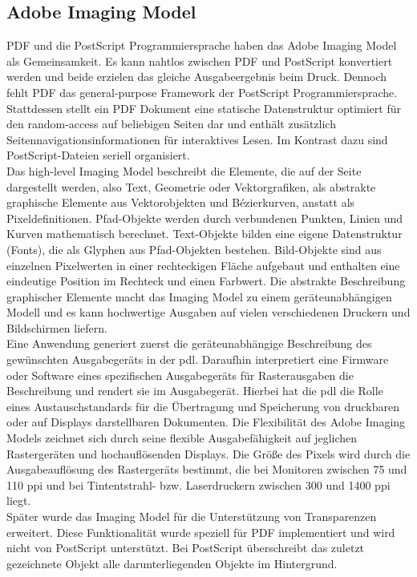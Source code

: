 \subsection{Adobe Imaging Model}
PDF und die PostScript Programmiersprache haben das Adobe Imaging Model als Gemeinsamkeit. Es kann nahtlos zwischen PDF und PostScript konvertiert werden und beide erzielen das gleiche Ausgabeergebnis beim Druck. Dennoch fehlt PDF das general-purpose Framework der PostScript Programmiersprache. Stattdessen stellt ein PDF Dokument eine statische Datenstruktur optimiert für den random-access auf beliebigen Seiten dar und enthält zusätzlich Seitennavigationsinformationen für interaktives Lesen. Im Kontrast dazu sind PostScript-Dateien seriell organisiert. \\
Das high-level Imaging Model beschreibt die Elemente, die auf der Seite dargestellt werden, also Text, Geometrie oder Vektorgrafiken, als abstrakte graphische Elemente aus Vektorobjekten und Bézierkurven, anstatt als Pixeldefinitionen. \cite{adobe-postscript} Pfad-Objekte werden durch verbundenen Punkten, Linien und Kurven mathematisch berechnet. Text-Objekte bilden eine eigene Datenstruktur (Fonts), die als Glyphen aus Pfad-Objekten bestehen. Bild-Objekte sind aus einzelnen Pixelwerten in einer rechteckigen Fläche aufgebaut und enthalten eine eindeutige Position im Rechteck und einen Farbwert. Die abstrakte Beschreibung graphischer Elemente macht das Imaging Model zu einem geräteunabhängigen Modell und es kann hochwertige Ausgaben auf vielen verschiedenen Druckern und Bildschirmen liefern. \\
Eine Anwendung generiert zuerst die geräteunabhängige Beschreibung des gewünschten Ausgabegeräts in der \gls{pdl}. Daraufhin interpretiert eine Firmware oder Software eines spezifischen Ausgabegeräts für Rasterausgaben die Beschreibung und rendert sie im Ausgabegerät. Hierbei hat die \gls{pdl} die Rolle eines Austauschstandards für die Übertragung und Speicherung von druckbaren oder auf Displays darstellbaren Dokumenten. \cite{adobe-postscript} Die Flexibilität des Adobe Imaging Models zeichnet sich durch seine flexible Ausgabefähigkeit auf jeglichen Rastergeräten und hochauflösenden Displays. Die Größe des Pixels wird durch die Ausgabeauflösung des Rastergeräts bestimmt, die bei Monitoren zwischen 75 und 110 \gls{ppi} und bei Tintentstrahl- bzw. Laserdruckern zwischen 300 und 1400 \gls{ppi} liegt. \\
Später wurde das Imaging Model für die Unterstützung von Transparenzen erweitert. Diese Funktionalität wurde speziell für PDF implementiert und wird nicht von PostScript unterstützt. Bei PostScript überschreibt das zuletzt gezeichnete Objekt alle darunterliegenden Objekte im Hintergrund. 
\cite{schneeberger}

